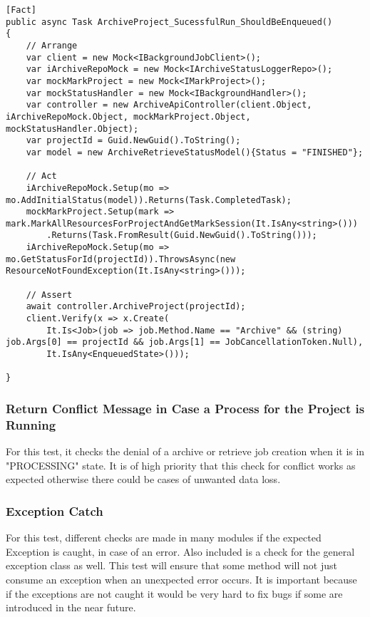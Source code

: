 \begin{lstlisting}[language={[Sharp]C}, caption={Hangfire Job creation test}, captionpos=b,label={lst:hangfireCreate}]
[Fact]
public async Task ArchiveProject_SucessfulRun_ShouldBeEnqueued()
{
    // Arrange
    var client = new Mock<IBackgroundJobClient>();
    var iArchiveRepoMock = new Mock<IArchiveStatusLoggerRepo>();
    var mockMarkProject = new Mock<IMarkProject>();
    var mockStatusHandler = new Mock<IBackgroundHandler>();
    var controller = new ArchiveApiController(client.Object, iArchiveRepoMock.Object, mockMarkProject.Object, mockStatusHandler.Object);
    var projectId = Guid.NewGuid().ToString();
    var model = new ArchiveRetrieveStatusModel(){Status = "FINISHED"}; 
    
    // Act
    iArchiveRepoMock.Setup(mo => mo.AddInitialStatus(model)).Returns(Task.CompletedTask);
    mockMarkProject.Setup(mark => mark.MarkAllResourcesForProjectAndGetMarkSession(It.IsAny<string>()))
        .Returns(Task.FromResult(Guid.NewGuid().ToString()));
    iArchiveRepoMock.Setup(mo => mo.GetStatusForId(projectId)).ThrowsAsync(new ResourceNotFoundException(It.IsAny<string>()));

    // Assert
    await controller.ArchiveProject(projectId);
    client.Verify(x => x.Create(
        It.Is<Job>(job => job.Method.Name == "Archive" && (string) job.Args[0] == projectId && job.Args[1] == JobCancellationToken.Null),
        It.IsAny<EnqueuedState>()));

}
\end{lstlisting}

\subsubsection{Return Conflict Message in Case a Process for the Project is Running}
For this test, it checks the denial of a archive or retrieve job creation when it is in "PROCESSING" state. It is of high priority that this check
for conflict works as expected otherwise there could be cases of unwanted data loss. 

\subsubsection{Exception Catch}
For this test, different checks are made in many modules if the expected Exception is caught, in case of an error. Also included is a check for the general
exception class as well. This test will ensure that some method will not just consume an exception when an unexpected error occurs. It is important because if 
the exceptions are not caught it would be very hard to fix bugs if some are introduced in the near future.

